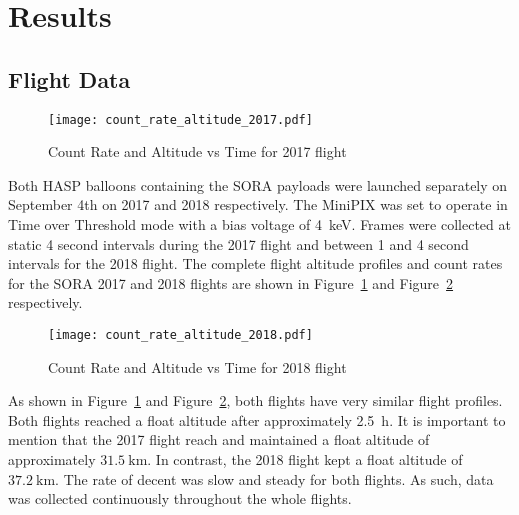 \section{Results}
\label{Results}

\subsection{Flight Data}

\begin{figure}[H]
\centering
\texttt{[image: count\_rate\_altitude\_2017.pdf]}
\caption{Count Rate and Altitude vs Time for 2017 flight}
\label{fig:ratealttime_2017}
\end{figure}
%
Both HASP balloons containing the SORA payloads were launched separately on September 4th on 2017 and 2018 respectively.  The MiniPIX was set to operate in Time over Threshold mode with a bias voltage of \SI{4}{\kilo\eV}.  Frames were collected at static 4 second intervals during the 2017 flight and between 1 and 4 second intervals for the 2018 flight.  The complete flight altitude profiles and count rates for the SORA  2017 and 2018 flights are shown in Figure~\ref{fig:ratealttime_2017} and Figure~\ref{fig:ratealttime_2018} respectively.
%
\begin{figure}[H]
\centering
\texttt{[image: count\_rate\_altitude\_2018.pdf]}
\caption{Count Rate and Altitude vs Time for 2018 flight}
\label{fig:ratealttime_2018}
\end{figure}
%
As shown in Figure~\ref{fig:ratealttime_2017} and Figure~\ref{fig:ratealttime_2018}, both flights have very similar flight profiles.  Both flights reached a float altitude after approximately \SI{2.5}{\hour}.  It is important to mention that the 2017 flight reach and maintained a float altitude of approximately $\SI{31.5}{\kilo\meter}$.  In contrast, the 2018 flight kept a float altitude of $\SI{37.2}{\kilo\meter}$.  The rate of decent was slow and steady for both flights.  As such, data was collected continuously throughout the whole flights.
%

